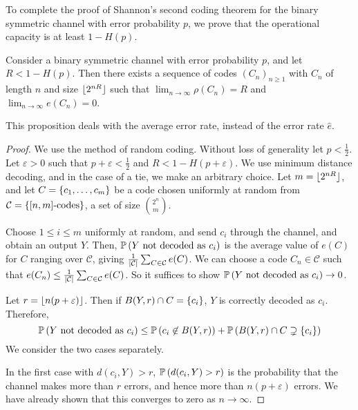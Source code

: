 To complete the proof of Shannon's second coding theorem for the binary symmetric channel with error probability \( p \), we prove that the operational capacity is at least \( 1 - H(p) \).
\begin{proposition}
    Consider a binary symmetric channel with error probability \( p \), and let \( R < 1 - H(p) \).
    Then there exists a sequence of codes \( (C_n)_{n \geq 1} \) with \( C_n \) of length \( n \) and size \( \lfloor2^{nR}\rfloor \) such that \( \lim_{n \to \infty} \rho(C_n) = R \) and \( \lim_{n \to \infty} e(C_n) = 0 \).
\end{proposition}
\begin{remark}
    This proposition deals with the average error rate, instead of the error rate \( \hat e \).
\end{remark}
\begin{proof}
    We use the method of random coding.
    Without loss of generality let \( p < \frac{1}{2} \).
    Let \( \varepsilon > 0 \) such that \( p + \varepsilon < \frac{1}{2} \) and \( R < 1 - H(p + \varepsilon) \).
    We use minimum distance decoding, and in the case of a tie, we make an arbitrary choice.
    Let \( m = \lfloor2^{nR}\rfloor \), and let \( C = \qty{c_1, \dots, c_m} \) be a code chosen uniformly at random from \( \mathcal C = \qty{[n,m]\text{-codes}} \), a set of size \( \binom{2^n}{m} \).

    Choose \( 1 \leq i \leq m \) uniformly at random, and send \( c_i \) through the channel, and obtain an output \( Y \).
    Then, \( \mathbb{P}\left({Y \text{ not decoded as } c_i}\right) \) is the average value of \( e(C) \) for \( C \) ranging over \( \mathcal C \), giving \( \frac{1}{\abs{\mathcal C}} \sum_{C \in \mathcal C} e(C) \).
    We can choose a code \( C_n \in \mathcal C \) such that \( e(C_n) \leq \frac{1}{\abs{\mathcal C}}\sum_{C \in \mathcal C} e(C) \).
    So it suffices to show \( \mathbb{P}\left({Y \text{ not decoded as } c_i}\right) \to 0 \).

    Let \( r = \lfloor n(p + \varepsilon)\rfloor \).
    Then if \( B(Y,r) \cap C = \qty{c_i} \), \( Y \) is correctly decoded as \( c_i \).
    Therefore,
    \[ \mathbb{P}\left({Y \text{ not decoded as } c_i}\right) \leq \mathbb{P}\left({c_i \not\in B(Y,r)}\right) + \mathbb{P}\left({B(Y,r) \cap C \supsetneq \qty{c_i}}\right) \]
    We consider the two cases separately.

    In the first case with \( d(c_i,Y) > r \), \( \mathbb{P}\left({d(c_i,Y) > r}\right) \) is the probability that the channel makes more than \( r \) errors, and hence more than \( n(p + \varepsilon) \) errors.
    We have already shown that this converges to zero as \( n \to \infty \).


\end{proof}

